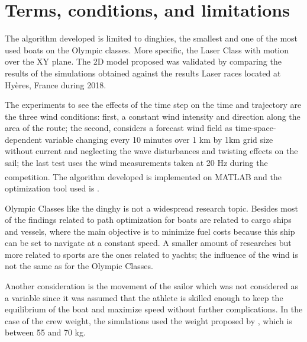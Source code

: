  \section{Terms, conditions, and limitations}
The algorithm developed is limited to dinghies, the smallest and one of the most used boats on the Olympic classes. More specific, the Laser Class with motion over the XY plane. The 2D model proposed was validated by comparing the results of the simulations obtained against the results Laser races located at Hyères, France during 2018.\par \noindent The experiments to see the effects of the time step on the time and trajectory are the three wind conditions:%
first, a constant wind intensity and direction along the area of the route; the second, considers a forecast wind field as time-space-dependent variable changing every 10 minutes over 1 km by 1km grid size without current and neglecting the wave disturbances and twisting effects on the sail; the last test %
uses the wind measurements taken at 20 Hz during the competition. The algorithm developed is implemented on MATLAB\textsuperscript{\textregistered} and the optimization tool used is \cite{MatlabOTB}.\par 

Olympic Classes like the dinghy is not a widespread research topic. Besides most of the findings related to path optimization for boats are related to cargo ships and vessels, where the main objective is to minimize fuel costs because this ship can be set to navigate at a constant speed. A smaller amount of researches but more related to sports are the ones related to yachts; the influence of the wind is not the same as for the Olympic Classes. \par \noindent 
Another consideration is the movement of the sailor which was not considered as a variable since it was assumed that the athlete is skilled enough to keep the equilibrium of the boat and maximize speed without further complications. In the case of the crew weight, the simulations used the weight proposed by \cite{laser_opt}, which is between	55 and 70 kg.\par 

